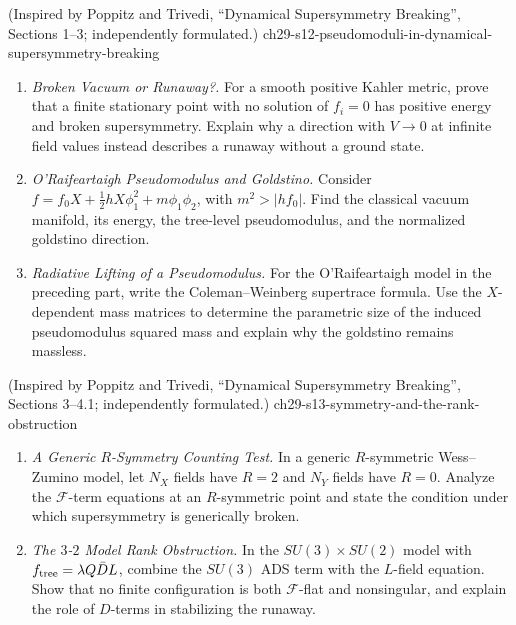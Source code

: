 \begin{enumerate}
    {(Inspired by Poppitz and Trivedi, ``Dynamical Supersymmetry Breaking'', Sections 1--3; independently formulated.)}
    {ch29-s12-pseudomoduli-in-dynamical-supersymmetry-breaking}
  \begin{enumerate}
    \item \emph{Broken Vacuum or Runaway?.}
    For a smooth positive Kahler metric, prove that a finite stationary
      point with no solution of \(f_i=0\) has positive energy and broken
      supersymmetry.  Explain why a direction with \(V\to0\) at infinite
      field values instead describes a runaway without a ground state.
    \item \emph{O'Raifeartaigh Pseudomodulus and Goldstino.}
    Consider
      \(f=f_0X+\tfrac12hX\phi_1^2+m\phi_1\phi_2\), with
      \(m^2>\lvert hf_0\rvert\).  Find the classical vacuum manifold, its
      energy, the tree-level pseudomodulus, and the normalized goldstino
      direction.
    \item \emph{Radiative Lifting of a Pseudomodulus.}
    For the O'Raifeartaigh model in the preceding part, write the
      Coleman--Weinberg supertrace formula.  Use the \(X\)-dependent mass
      matrices to determine the parametric size of the induced
      pseudomodulus squared mass and explain why the goldstino remains
      massless.
  \end{enumerate}

    {(Inspired by Poppitz and Trivedi, ``Dynamical Supersymmetry Breaking'', Sections 3--4.1; independently formulated.)}
    {ch29-s13-symmetry-and-the-rank-obstruction}
  \begin{enumerate}
    \item \emph{A Generic \(R\)-Symmetry Counting Test.}
    In a generic \(R\)-symmetric Wess--Zumino model, let \(N_X\) fields
      have \(R=2\) and \(N_Y\) fields have \(R=0\).  Analyze the
      \(\mathcal F\)-term equations at an \(R\)-symmetric point and state the
      condition under which supersymmetry is generically broken.
    \item \emph{The \(3\)-\(2\) Model Rank Obstruction.}
    In the \(SU(3)\times SU(2)\) model with
      \(f_{\rm tree}=\lambda Q\bar D L\), combine the \(SU(3)\) ADS term with
      the \(L\)-field equation.  Show that no finite configuration is both
      \(\mathcal F\)-flat and nonsingular, and explain the role of
      \(D\)-terms in stabilizing the runaway.
  \end{enumerate}


\end{enumerate}
